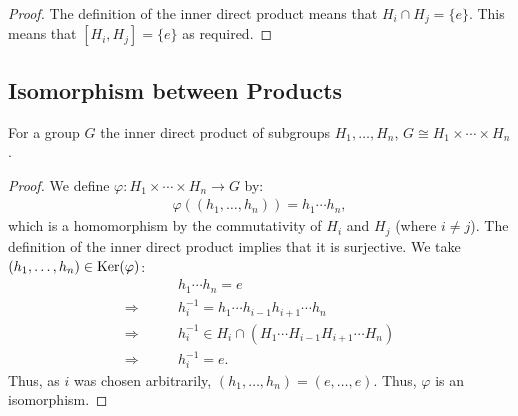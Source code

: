 \begin{proof}
    The definition of the inner direct product means that
    $H_i \cap H_j = \{e\}$. This means that $[H_i, H_j] = \{e\}$
    as required.
\end{proof}

\subsection{Isomorphism between Products}

For a group $G$ the inner direct product of subgroups $H_1, \ldots, H_n$,
$G \cong H_1 \times \cdots \times H_n$.

\begin{proof}
    We define $\varphi : H_1 \times \cdots \times H_n \to G$ by: \begin{align*}
        \varphi((h_1, \ldots, h_n)) = h_1 \cdots h_n,
    \end{align*} which is a homomorphism by the commutativity of
    $H_i$ and $H_j$ (where $i \neq j$). The definition of the
    inner direct product implies that it is surjective. We
    take $(h_1, \ldots, h_n) \in \operatorname{Ker}(\varphi)$: \begin{align*}
        &h_1 \cdots h_n = e \\
        \Longrightarrow \qquad& h_i^{-1} = h_1 \cdots h_{i - 1}h_{i + 1} \cdots h_n \\
        \Longrightarrow \qquad& h_i^{-1} \in H_i \cap (H_1 \cdots H_{i - 1} H_{i + 1} \cdots H_n) \\
        \Longrightarrow \qquad& h_i^{-1} = e.
    \end{align*} Thus, as $i$ was chosen arbitrarily, $(h_1, \ldots, h_n) = (e, \ldots, e)$.
    Thus, $\varphi$ is an isomorphism.
\end{proof}
